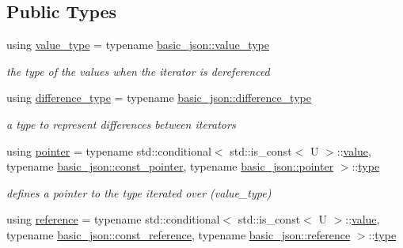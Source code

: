 \subsection*{Public Types}
\begin{DoxyCompactItemize}
\item 
using \mbox{\hyperlink{classnlohmann_1_1basic__json_1_1iter__impl_a4d0518f3f2edae9dbaf7ef02f4f20add}{value\+\_\+type}} = typename \mbox{\hyperlink{classnlohmann_1_1basic__json_a2b3297873b70c080837e8eedc4fec32f}{basic\+\_\+json\+::value\+\_\+type}}
\begin{DoxyCompactList}\small\item\em the type of the values when the iterator is dereferenced \end{DoxyCompactList}\item 
using \mbox{\hyperlink{classnlohmann_1_1basic__json_1_1iter__impl_aa3d908ee643e5938d32e5f6d261d7715}{difference\+\_\+type}} = typename \mbox{\hyperlink{classnlohmann_1_1basic__json_afe7c1303357e19cea9527af4e9a31d8f}{basic\+\_\+json\+::difference\+\_\+type}}
\begin{DoxyCompactList}\small\item\em a type to represent differences between iterators \end{DoxyCompactList}\item 
using \mbox{\hyperlink{classnlohmann_1_1basic__json_1_1iter__impl_a3dddd7fa38b36e2531700ceb4a1ce9a8}{pointer}} = typename std\+::conditional$<$ std\+::is\+\_\+const$<$ U $>$\+::\mbox{\hyperlink{classnlohmann_1_1basic__json_1_1iter__impl_a92e849ca687355935c02f492be936b68}{value}}, typename \mbox{\hyperlink{classnlohmann_1_1basic__json_aff3d5cd2a75612364b888d8693231b58}{basic\+\_\+json\+::const\+\_\+pointer}}, typename \mbox{\hyperlink{classnlohmann_1_1basic__json_aefee1f777198c68724bd127e0c8abbe4}{basic\+\_\+json\+::pointer}} $>$\+::\mbox{\hyperlink{classnlohmann_1_1basic__json_a2b2d781d7f2a4ee41bc0016e931cadf7}{type}}
\begin{DoxyCompactList}\small\item\em defines a pointer to the type iterated over (value\+\_\+type) \end{DoxyCompactList}\item 
using \mbox{\hyperlink{classnlohmann_1_1basic__json_1_1iter__impl_ae09599e9cb4a947020a0265c0c4f3d5e}{reference}} = typename std\+::conditional$<$ std\+::is\+\_\+const$<$ U $>$\+::\mbox{\hyperlink{classnlohmann_1_1basic__json_1_1iter__impl_a92e849ca687355935c02f492be936b68}{value}}, typename \mbox{\hyperlink{classnlohmann_1_1basic__json_a4057c5425f4faacfe39a8046871786ca}{basic\+\_\+json\+::const\+\_\+reference}}, typename \mbox{\hyperlink{classnlohmann_1_1basic__json_ac6a5eddd156c776ac75ff54cfe54a5bc}{basic\+\_\+json\+::reference}} $>$\+::\mbox{\hyperlink{classnlohmann_1_1basic__json_a2b2d781d7f2a4ee41bc0016e931cadf7}{type}}

\end{DoxyCompactItemize}
